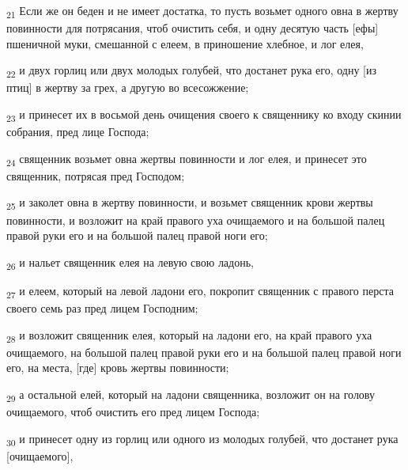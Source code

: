 \begin{tcolorbox}
\textsubscript{21} Если же он беден и не имеет достатка, то пусть возьмет одного овна в жертву повинности для потрясания, чтоб очистить себя, и одну десятую часть [ефы] пшеничной муки, смешанной с елеем, в приношение хлебное, и лог елея,
\end{tcolorbox}
\begin{tcolorbox}
\textsubscript{22} и двух горлиц или двух молодых голубей, что достанет рука его, одну [из птиц] в жертву за грех, а другую во всесожжение;
\end{tcolorbox}
\begin{tcolorbox}
\textsubscript{23} и принесет их в восьмой день очищения своего к священнику ко входу скинии собрания, пред лице Господа;
\end{tcolorbox}
\begin{tcolorbox}
\textsubscript{24} священник возьмет овна жертвы повинности и лог елея, и принесет это священник, потрясая пред Господом;
\end{tcolorbox}
\begin{tcolorbox}
\textsubscript{25} и заколет овна в жертву повинности, и возьмет священник крови жертвы повинности, и возложит на край правого уха очищаемого и на большой палец правой руки его и на большой палец правой ноги его;
\end{tcolorbox}
\begin{tcolorbox}
\textsubscript{26} и нальет священник елея на левую свою ладонь,
\end{tcolorbox}
\begin{tcolorbox}
\textsubscript{27} и елеем, который на левой ладони его, покропит священник с правого перста своего семь раз пред лицем Господним;
\end{tcolorbox}
\begin{tcolorbox}
\textsubscript{28} и возложит священник елея, который на ладони его, на край правого уха очищаемого, на большой палец правой руки его и на большой палец правой ноги его, на места, [где] кровь жертвы повинности;
\end{tcolorbox}
\begin{tcolorbox}
\textsubscript{29} а остальной елей, который на ладони священника, возложит он на голову очищаемого, чтоб очистить его пред лицем Господа;
\end{tcolorbox}
\begin{tcolorbox}
\textsubscript{30} и принесет одну из горлиц или одного из молодых голубей, что достанет рука [очищаемого],
\end{tcolorbox}
